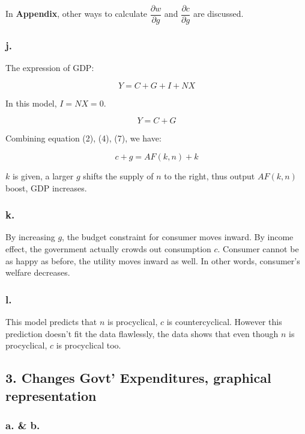 \documentclass{article}
\begin{document}
In \textbf{Appendix}, other ways to calculate $\dfrac{\partial w}{\partial g}$ and $\dfrac{\partial c}{\partial g}$ are discussed.

\subsubsection*{\textrm{j.}}

The expression of GDP:

\begin{equation*}
    Y=C+G+I+NX
\end{equation*}

In this model, $I=NX=0$.

\begin{equation*}
    Y=C+G
\end{equation*}

Combining equation (2), (4), (7), we have:

\begin{equation*}
    c+g=AF(k,n)+k
\end{equation*}

$k$ is given, a larger $g$ shifts the supply of $n$ to the right, thus output $AF(k,n)$ boost, GDP increases.

\subsubsection*{\textrm{k.}}

By increasing $g$, the budget constraint for consumer moves inward. By income effect, the government actually crowds out consumption $c$. Consumer cannot be as happy as before, the utility moves inward as well. In other words, consumer's welfare decreases.

\subsubsection*{\textrm{l.}}

This model predicts that $n$ is procyclical, $c$ is countercyclical. However this prediction doesn't fit the data flawlessly, the data shows that even though $n$ is procyclical, $c$ is procyclical too.

\subsection*{\textrm{3. Changes Govt' Expenditures, graphical representation}}

\subsubsection*{\textrm{a. \& b.}}
\end{document}
